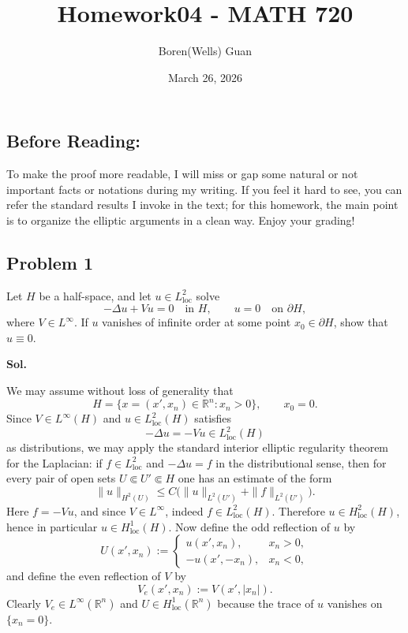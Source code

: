 \documentclass[lang=en,11pt,a4paper,citestyle=authoryear]{elegantpaper}
\title{Homework04 - MATH 720}
\author{Boren(Wells) Guan}
\date{March 26, 2026}
\newcommand{\R}{\mathbb{R}}
\begin{document}
\maketitle

\subsection*{Before Reading:}\par
To make the proof more readable, I will miss or gap some natural or not important facts or notations during my writing. If you feel it hard to see, you can refer the standard results I invoke in the text; for this homework, the main point is to organize the elliptic arguments in a clean way. Enjoy your grading!

\subsection*{Problem 1}
Let $H$ be a half-space, and let $u\in L^2_{\mathrm{loc}}$ solve
\[
-\Delta u + Vu = 0 \quad \text{in }H,
\qquad u=0 \quad \text{on }\partial H,
\]
where $V\in L^\infty$. If $u$ vanishes of infinite order at some point $x_0\in \partial H$, show that $u\equiv 0$.

\vspace{0.5em}
\textbf{Sol.} \par
We may assume without loss of generality that
\[
H = \{x=(x',x_n)\in \R^n:x_n>0\},\qquad x_0=0.
\]
Since $V\in L^\infty(H)$ and $u\in L^2_{\mathrm{loc}}(H)$ satisfies
\[
-\Delta u = -Vu \in L^2_{\mathrm{loc}}(H)
\]
as distributions, we may apply the standard interior elliptic regularity theorem for the Laplacian: if $f\in L^2_{\mathrm{loc}}$ and $-\Delta u=f$ in the distributional sense, then for every pair of open sets $U\Subset U'\Subset H$ one has an estimate of the form
\[
\|u\|_{H^2(U)}\le C\bigl(\|u\|_{L^2(U')}+\|f\|_{L^2(U')}\bigr).
\]
Here $f=-Vu$, and since $V\in L^\infty$, indeed $f\in L^2_{\mathrm{loc}}(H)$. Therefore $u\in H^2_{\mathrm{loc}}(H)$, hence in particular $u\in H^1_{\mathrm{loc}}(H)$. Now define the odd reflection of $u$ by
\[
U(x',x_n):=
\begin{cases}
 u(x',x_n), & x_n>0,\\
- u(x',-x_n), & x_n<0,
\end{cases}
\]
and define the even reflection of $V$ by
\[
V_e(x',x_n):=V(x',|x_n|).
\]
Clearly $V_e\in L^\infty(\R^n)$ and $U\in H^1_{\mathrm{loc}}(\R^n)$ because the trace of $u$ vanishes on $\{x_n=0\}$.
\end{document}
